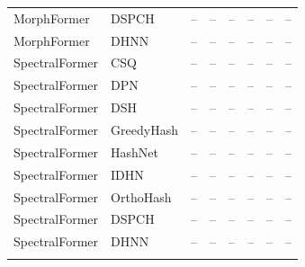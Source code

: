 \begin{longtable}{llrrrrrr}
MorphFormer & DSPCH & -- & -- & -- & -- & -- & -- \\
MorphFormer & DHNN & -- & -- & -- & -- & -- & -- \\
\addlinespace
SpectralFormer & CSQ & -- & -- & -- & -- & -- & -- \\
SpectralFormer & DPN & -- & -- & -- & -- & -- & -- \\
SpectralFormer & DSH & -- & -- & -- & -- & -- & -- \\
SpectralFormer & GreedyHash & -- & -- & -- & -- & -- & -- \\
SpectralFormer & HashNet & -- & -- & -- & -- & -- & -- \\
SpectralFormer & IDHN & -- & -- & -- & -- & -- & -- \\
SpectralFormer & OrthoHash & -- & -- & -- & -- & -- & -- \\
SpectralFormer & DSPCH & -- & -- & -- & -- & -- & -- \\
SpectralFormer & DHNN & -- & -- & -- & -- & -- & -- \\
\addlinespace
\end{longtable}
